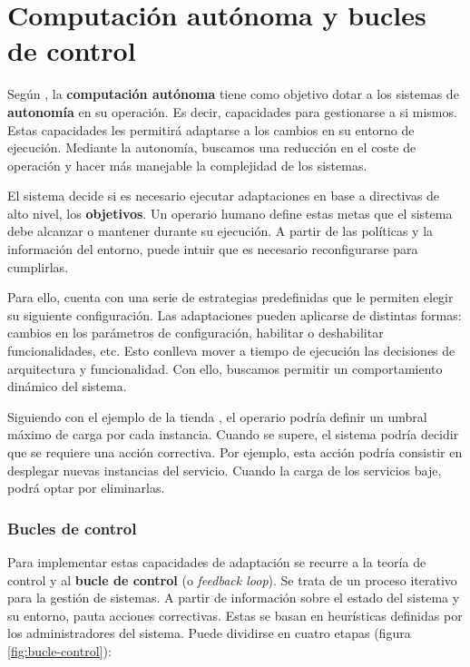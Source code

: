 \section{Computación autónoma y bucles de control}

Según \cite{ibmcorporationArchitecturalBlueprintAutonomic2006}, la \textbf{computación autónoma} tiene como objetivo dotar a los sistemas de \textbf{autonomía} en su operación. Es decir, capacidades para gestionarse a si mismos. Estas capacidades les permitirá adaptarse a los cambios en su entorno de ejecución. Mediante la autonomía, buscamos una reducción en el coste de operación y hacer más manejable la complejidad de los sistemas.

El sistema decide si es necesario ejecutar adaptaciones en base a directivas de alto nivel, los \textbf{objetivos}. Un operario humano define estas metas que el sistema debe alcanzar o mantener durante su ejecución. A partir de las políticas y la información del entorno, puede intuir que es necesario reconfigurarse para cumplirlas.

Para ello, cuenta con una serie de estrategias predefinidas que le permiten elegir su siguiente configuración. \cite{garlanIncreasingSystemDependability2003} Las adaptaciones pueden aplicarse de distintas formas: cambios en los parámetros de configuración, habilitar o deshabilitar funcionalidades, etc. Esto conlleva mover a tiempo de ejecución las decisiones de arquitectura y funcionalidad. Con ello, buscamos permitir un comportamiento dinámico del sistema. \cite{brunEngineeringSelfAdaptiveSystems2009}

Siguiendo con el ejemplo de la tienda , el operario podría definir un umbral máximo de carga por cada instancia. Cuando se supere, el sistema podría decidir que se requiere una acción correctiva. Por ejemplo, esta acción podría consistir en desplegar nuevas instancias del servicio. Cuando la carga de los servicios baje, podrá optar por eliminarlas.

\subsubsection{Bucles de control}

Para implementar estas capacidades de adaptación se recurre a la teoría de control y al \textbf{bucle de control} (o \emph{feedback loop}). \cite{brunEngineeringSelfAdaptiveSystems2009} Se trata de un proceso iterativo para la gestión de sistemas. A partir de información sobre el estado del sistema y su entorno, pauta acciones correctivas. Estas se basan en heurísticas definidas por los administradores del sistema. Puede dividirse en cuatro etapas (figura \ref{fig:bucle-control}):

